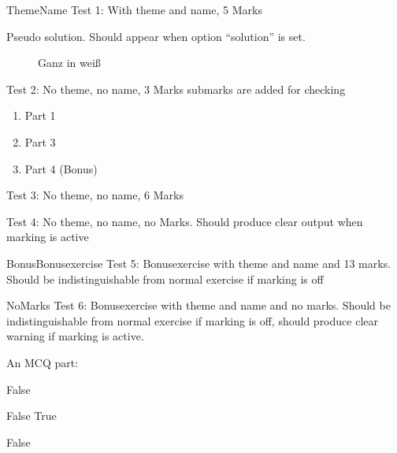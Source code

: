 \documentclass[pdftex,quiz,formula]{newcsen}
\begin{document}
\begin{exercise}{5}{Theme}{Name}
  Test 1: With theme and name, 5 Marks
  \begin{solution}
    Pseudo solution. Should appear when option ``solution'' is set.
  \end{solution}
\end{exercise}

\begin{figure}[ht]
  \centering
  \vspace*{3cm}
  \caption{Ganz in weiß}
  \label{fig:test}
\end{figure}

\begin{exercise}{3}{}{}
  Test 2: No theme, no name, 3 Marks submarks are added for checking
  \begin{enumerate}
  \item Part 1 
  \item Part 3 
  \item Part 4 (Bonus) 
  \end{enumerate}
\end{exercise}

\begin{exercise}{6}{}{}
  Test 3: No theme, no name, 6 Marks
\end{exercise}

\begin{exercise}{}{}{}
  Test 4: No theme, no name, no Marks. Should produce clear output
  when marking is active
\end{exercise}

\begin{bonusexercise}{13}{Bonus}{Bonusexercise}
  Test 5: Bonusexercise with theme and name and 13 marks. Should be
  indistinguishable from normal exercise if marking is off
\end{bonusexercise}

\begin{bonusexercise}{}{No}{Marks}
  Test 6: Bonusexercise with theme and name and no marks. Should be
  indistinguishable from normal exercise if marking is off, should
  produce clear warning if marking is active.

  An MCQ part:
  \begin{mcq}
    \item False
    \item False
    \checkedItem True
    \item False
  \end{mcq}
\end{bonusexercise}
\end{document}
